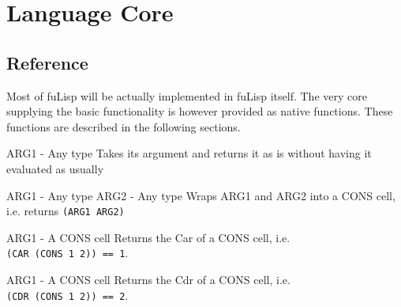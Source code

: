 \section{Language Core}

\subsection{\label{sec:CoreReference}Reference}

Most of fuLisp will be actually implemented in fuLisp itself. 
The very core supplying the basic functionality is however provided as native
functions.
These functions are described in the following sections.

{ARG1 - Any type}
{Takes its argument and returns it as is without having it evaluated as usually}

{ARG1 - Any type  ARG2 - Any type}
{Wraps ARG1 and ARG2 into a CONS cell, i.e. returns \texttt{(ARG1 ARG2)}}

{ARG1 - A CONS cell}
{Returns the Car of a CONS cell, i.e.  \\\texttt{(CAR (CONS 1 2)) == 1}.}

{ARG1 - A CONS cell}
{Returns the Cdr of a CONS cell, i.e. \\\texttt{(CDR (CONS 1 2)) == 2}.}

